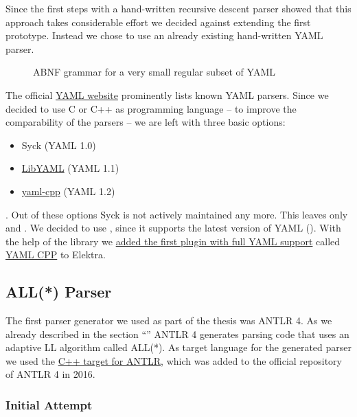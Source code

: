Since the first steps with a hand-written recursive descent parser showed that this approach takes considerable effort we decided against extending the first prototype. Instead we chose to use an already existing hand-written YAML parser.

\begin{figure}[htbp]
  \centering
  \begin{code-boxed}
    
  \end{code-boxed}
  \caption{ABNF grammar for a very small regular subset of YAML}
  \label{cod:abnf_recurive_descent}
\end{figure}

The official \href{http://yaml.org}{YAML website} prominently lists known YAML parsers. Since we decided to use C or C++ as programming language – to improve the comparability of the parsers – we are left with three basic options:

\begin{itemize}
  \item Syck (YAML 1.0)
  \item \href{https://github.com/yaml/libyaml}{LibYAML} (YAML 1.1)
  \item \href{https://github.com/jbeder/yaml-cpp}{yaml-cpp} (YAML 1.2)
\end{itemize}

. Out of these options Syck is not actively maintained any more. This leaves only  and . We decided to use , since it supports the latest version of YAML (). With the help of the library we \href{https://github.com/ElektraInitiative/libelektra/pull/1613}{added the first plugin with full YAML support} called \href{https://www.libelektra.org/plugins/yamlcpp}{YAML CPP} to Elektra.

\subsection{ALL(*) Parser}

The first parser generator we used as part of the thesis was \gls{ANTLR} 4. As we already described in the section “” ANTLR 4 generates parsing code that uses an adaptive LL algorithm called ALL(*). As target language for the generated parser we used the \href{https://github.com/antlr/antlr4/pull/1210}{C++ target for ANTLR}, which was added to the official repository of ANTLR 4 in 2016.

\subsubsection{Initial Attempt}

